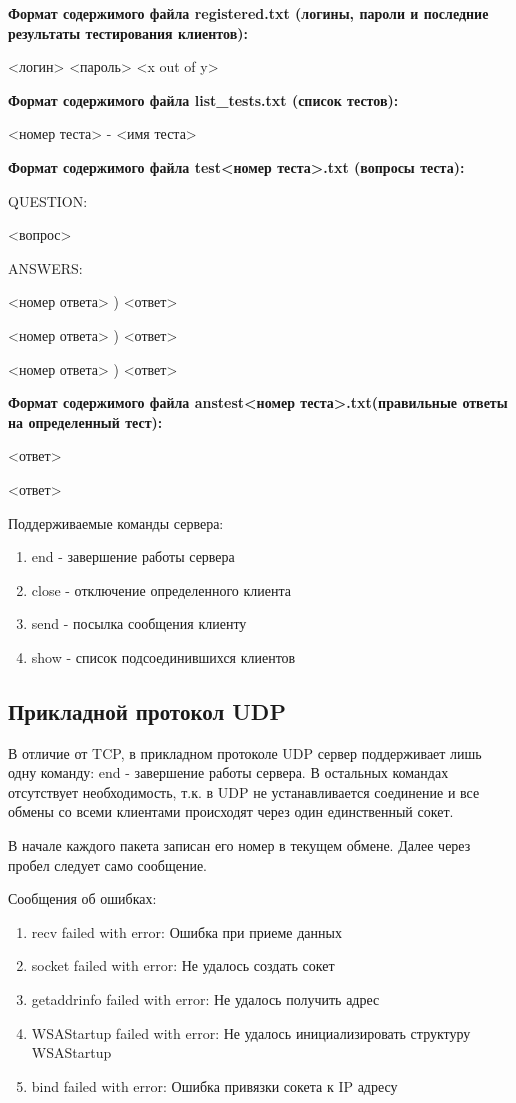 \textbf{Формат содержимого файла registered.txt (логины, пароли и последние результаты тестирования клиентов):}

<логин> <пароль> <x out of y>


\textbf{Формат содержимого файла list\_tests.txt (список тестов):}

<номер теста> - <имя теста>

\textbf{Формат содержимого файла test<номер теста>.txt (вопросы теста):}

QUESTION:

<вопрос>

ANSWERS:

<номер ответа> ) <ответ>

<номер ответа> ) <ответ>

<номер ответа> ) <ответ>


\textbf{Формат содержимого файла anstest<номер теста>.txt(правильные ответы на определенный тест):}

<ответ>

<ответ>

\vspace{3mm}
Поддерживаемые команды сервера:

\begin{enumerate}
\item end - завершение работы сервера
\item close - отключение определенного клиента
\item send - посылка сообщения клиенту
\item show - список подсоединившихся клиентов
\end{enumerate}

\subsection{Прикладной протокол UDP}
В отличие от TCP, в прикладном протоколе UDP сервер поддерживает лишь одну команду: end - завершение работы сервера. В остальных командах отсутствует необходимость, т.к. в UDP не устанавливается соединение и все обмены со всеми клиентами происходят через один единственный сокет.

В начале каждого пакета записан его номер в текущем обмене. Далее через пробел следует само сообщение. 

\vspace{3mm}
Сообщения об ошибках:
\vspace{3mm}
\begin{enumerate}
\item recv failed with error: Ошибка при приеме данных
\item socket failed with error: Не удалось создать сокет
\item getaddrinfo failed with error: Не удалось получить адрес
\item WSAStartup failed with error: Не удалось инициализировать структуру WSAStartup
\item bind failed with error: Ошибка привязки сокета к IP адресу
\end{enumerate}



